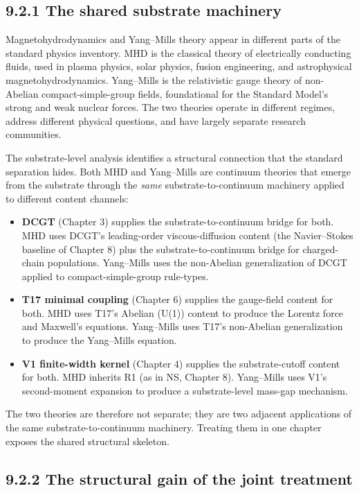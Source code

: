 \documentclass[11pt]{book}
\begin{document}
\subsection{9.2.1 The shared substrate machinery}

Magnetohydrodynamics and Yang–Mills theory appear in different parts of the standard physics inventory. MHD is the classical theory of electrically conducting fluids, used in plasma physics, solar physics, fusion engineering, and astrophysical magnetohydrodynamics. Yang–Mills is the relativistic gauge theory of non-Abelian compact-simple-group fields, foundational for the Standard Model's strong and weak nuclear forces. The two theories operate in different regimes, address different physical questions, and have largely separate research communities.

The substrate-level analysis identifies a structural connection that the standard separation hides. Both MHD and Yang–Mills are continuum theories that emerge from the substrate through the \textit{same} substrate-to-continuum machinery applied to different content channels:

\begin{itemize}
\item \textbf{DCGT} (Chapter 3) supplies the substrate-to-continuum bridge for both. MHD uses DCGT's leading-order viscous-diffusion content (the Navier–Stokes baseline of Chapter 8) plus the substrate-to-continuum bridge for charged-chain populations. Yang–Mills uses the non-Abelian generalization of DCGT applied to compact-simple-group rule-types.
\item \textbf{T17 minimal coupling} (Chapter 6) supplies the gauge-field content for both. MHD uses T17's Abelian (U(1)) content to produce the Lorentz force and Maxwell's equations. Yang–Mills uses T17's non-Abelian generalization to produce the Yang–Mills equation.
\item \textbf{V1 finite-width kernel} (Chapter 4) supplies the substrate-cutoff content for both. MHD inherits R1 (as in NS, Chapter 8). Yang–Mills uses V1's second-moment expansion to produce a substrate-level mass-gap mechanism.
\end{itemize}

The two theories are therefore not separate; they are two adjacent applications of the same substrate-to-continuum machinery. Treating them in one chapter exposes the shared structural skeleton.

\subsection{9.2.2 The structural gain of the joint treatment}
\end{document}
